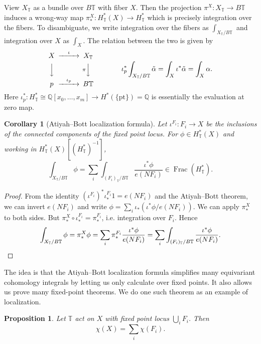 \documentclass{report}
\theoremstyle{plain}
\newtheorem{proposition}[theorem]{Proposition}
\newtheorem{corollary}[theorem]{Corollary}
\theoremstyle{definition}
\theoremstyle{remark}
\newcommand{\bT}{\mathbb{T}}
\newcommand{\bQ}{\mathbb{Q}}
\DeclareMathOperator{\Frac}{Frac}
\newcommand{\pt}{\mathrm{pt}}
\begin{document}
View $X_{\bT}$ as a bundle over $B\bT$ with fiber $X$. Then the
projection $\pi^X\colon X_{\bT} \to B\bT$ induces a wrong-way map
$\pi^X_*\colon H^*_{\bT}(X) \to H^*_{\bT}$ which is precisely
integration over the fibers. To disambiguate, we write integration
over the fibers as $\int_{X_{\bT}/B\bT}$ and integration over $X$ as
  $\int_X$. The relation between the two is given by
\[ \begin{CD}
  X @>\iota>> X_{\bT} \\
  @VVV  @V\pi VV \\
  p @>\iota_p>> B\bT
\end{CD} \qquad\qquad
\iota^*_p\int_{X_{\bT}/B\bT} \tilde{\alpha} = \int_X \iota^*\tilde{\alpha} = \int_X \alpha. \]
Here $\iota^*_p\colon H^*_{\bT} \cong \bQ[x_0, \ldots, x_m] \to
H^*(\{\pt\}) = \bQ$ is essentially the evaluation at zero map.

\begin{corollary}[Atiyah--Bott localization formula] \label{thm:equiv-localization}
  Let $\iota^{F_i}\colon F_i \to X$ be the inclusions of the connected
  components of the fixed point locus. For $\phi \in H_{\bT}^*(X)$
  and working in $H^*_{\bT}(X)[(H^*_{\bT})^{-1}]$,
  \[ \int_{X_{\bT}/B\bT} \phi = \sum_i \int_{(F_i)_{\bT}/B\bT} \frac{\iota^* \phi}{e(NF_i)} \in \Frac(H^*_{\bT}). \]
\end{corollary}

\begin{proof}
  From the identity $(\iota^{F_i})^* \iota^{F_i}_* 1 = e(NF_i)$ and
  the Atiyah--Bott theorem, we can invert $e(NF_i)$ and write $\phi =
  \sum_i \iota_*(\iota^* \phi/e(NF_i))$. We can apply $\pi^X_*$ to
  both sides. But $\pi^X_* \circ \iota^{F_i}_* = \pi^{F_i}_*$, i.e.
  integration over $F_i$. Hence
  \[ \int_{X_{\bT}/B\bT} \phi = \pi^X_*\phi = \sum_i \pi^{F_i}_* \frac{\iota^*\phi}{e(NF_i)} = \sum_i \int_{(F_i)_{\bT}/B\bT} \frac{\iota^*\phi}{e(NF_i)}. \qedhere \]
\end{proof}

The idea is that the Atiyah--Bott localization formula simplifies many
equivariant cohomology integrals by letting us only calculate over
fixed points. It also allows us prove many fixed-point theorems. We do
one such theorem as an example of localization.

\begin{proposition}
  Let $\bT$ act on $X$ with fixed point locus $\bigcup_i F_i$. Then
  \[ \chi(X) = \sum_i \chi(F_i). \]
\end{proposition}
\end{document}
